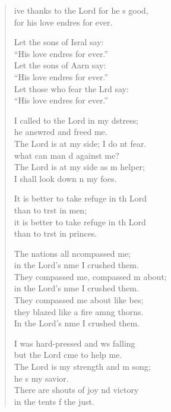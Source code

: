 \settowidth{\versewidth}{I shall not die, I shall live and recount his deeds.}
\begin{verse}%
  \begin{patverse}
    ive thanks to the Lord for he \pointup{\i}s good,\Med\\
    for his love endres for ever.

    Let the sons of Isral say:\Med\\
    “His love endres for ever.”\\
    Let the sons of Aarn say:\Med\\
    “His love endres for ever.”\\
    Let those who fear the Lrd say:\Med\\
    “His love endres for ever.”

    I called to the Lord in my d\pointup{\i}stress;\Med\\
    he answred and freed me.\\
    The Lord is at my side; I do nt fear.\Med\\
    what can man d against me?\\
    The Lord is at my side as m helper;\Med\\
    I shall look down n my foes.

    It is better to take refuge in th Lord\Med\\
    than to trst in men;\\
    it is better to take refuge in th Lord\Med\\
    than to trst in princes.

    The nations all ncompassed me;\Med\\
    in the Lord’s nme I crushed them.\\
    They compassed me, compassed m about;\Med\\
    in the Lord’s nme I crushed them.\\
    They compassed me about like bes;\Flex\\
    they blazed like a fire amng thorns.\Med\\
    In the Lord’s nme I crushed them.

    I was hard-pressed and ws falling\Med\\
    but the Lord cme to help me.\\
    The Lord is my strength and m song;\Med\\
    he \pointup{\i}s my savior.\\
    There are shouts of joy nd victory\Med\\
    in the tents f the just.


\end{patverse}
\end{verse}
